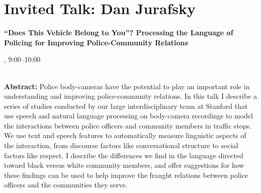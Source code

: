 \section{Invited Talk: Dan Jurafsky}

\begin{center}
\begin{Large}
{\bfseries\Large ``Does This Vehicle Belong to You''? Processing the Language of Policing for Improving Police-Community Relations}\vspace{1em}\par
\end{Large}


\daydateyear, 9:00--10:00 \vspace{1em}\\
\PlenaryLoc \\
\vspace{1em}\par
\end{center}

\noindent
{\bfseries Abstract:} Police body-cameras have the potential to play an important
role in understanding and improving police-community relations.
In this talk I describe a series of studies conducted by our
large interdisciplinary team at Stanford that use speech and
natural language processing on body-camera recordings to model the interactions
between police officers and community members in traffic stops.
We use text and speech features to automatically measure linguistic aspects of the interaction,
from discourse factors like conversational structure to social factors like respect.
I describe the differences we find in the language directed toward black versus white community members,
and offer suggestions for how these findings can be used to help improve the fraught relations between
police officers and the communities they serve.

\vspace{3em}\par 

